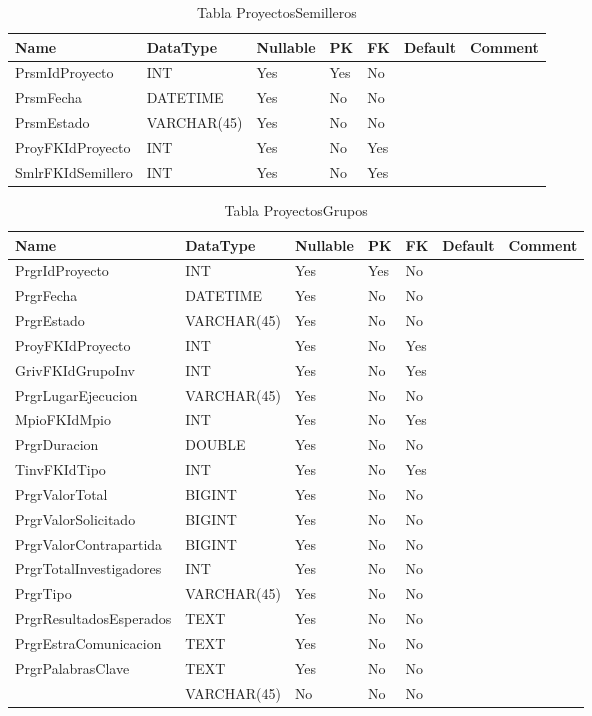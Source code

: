 \begin{table}
	\caption{Tabla ProyectosSemilleros}
	\label{labelTableProyectosSemilleros}
	\begin{tabular}{ |l|l|l|l|l|l|l| }
		\hline
		Name & DataType & Nullable & PK & FK & Default & Comment \\ \hline
		PrsmIdProyecto & INT & Yes & Yes & No &  & \\ \hline 
		PrsmFecha & DATETIME & Yes & No & No &  & \\ \hline 
		PrsmEstado & VARCHAR(45) & Yes & No & No &  & \\ \hline 
		ProyFKIdProyecto & INT & Yes & No & Yes &  & \\ \hline 
		SmlrFKIdSemillero & INT & Yes & No & Yes &  & \\ \hline 
		
	\end{tabular}
\end{table}


\begin{table}
	\caption{Tabla ProyectosGrupos}
	\label{labelTableProyectosGrupos}
	\begin{tabular}{ |l|l|l|l|l|l|l| }
		\hline
		Name & DataType & Nullable & PK & FK & Default & Comment \\ \hline
		PrgrIdProyecto & INT & Yes & Yes & No &  & \\ \hline 
		PrgrFecha & DATETIME & Yes & No & No &  & \\ \hline 
		PrgrEstado & VARCHAR(45) & Yes & No & No &  & \\ \hline 
		ProyFKIdProyecto & INT & Yes & No & Yes &  & \\ \hline 
		GrivFKIdGrupoInv & INT & Yes & No & Yes &  & \\ \hline 
		PrgrLugarEjecucion & VARCHAR(45) & Yes & No & No &  & \\ \hline 
		MpioFKIdMpio & INT & Yes & No & Yes &  & \\ \hline 
		PrgrDuracion & DOUBLE & Yes & No & No &  & \\ \hline 
		TinvFKIdTipo & INT & Yes & No & Yes &  & \\ \hline 
		PrgrValorTotal & BIGINT & Yes & No & No &  & \\ \hline 
		PrgrValorSolicitado & BIGINT & Yes & No & No &  & \\ \hline 
		PrgrValorContrapartida & BIGINT & Yes & No & No &  & \\ \hline 
		PrgrTotalInvestigadores & INT & Yes & No & No &  & \\ \hline 
		PrgrTipo & VARCHAR(45) & Yes & No & No &  & \\ \hline 
		PrgrResultadosEsperados & TEXT & Yes & No & No &  & \\ \hline 
		PrgrEstraComunicacion & TEXT & Yes & No & No &  & \\ \hline 
		PrgrPalabrasClave & TEXT & Yes & No & No &  & \\ \hline 
		& VARCHAR(45) & No & No & No &  & \\ \hline 
		
	\end{tabular}
\end{table}


